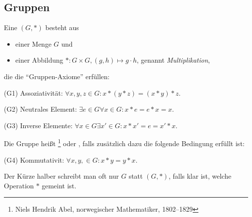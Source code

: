
\subsection{Gruppen}\label{gruppen}

\begin{definition}[Gruppen]
    \label{gruppen:def}
    Eine  $(G,*)$ besteht aus
    \begin{itemize}
        \item einer Menge $G$ und
        \item einer Abbildung $*: G\times G, (g,h) \mapsto g\cdot h$, genannt \emph{Multiplikation},
    \end{itemize}
    die die \enquote{Gruppen-Axiome} erfüllen:

    \begin{description}
        \item{(G1)} Assoziativität: $\forall x,y,z\in G: x\ast (y\ast z)=(x\ast y)\ast z$.
        \item{(G2)} Neutrales Element: $\exists e \in G \forall x\in G: x\ast e=e\ast x=x$.
        \item{(G3)} Inverse Elemente: $\forall x \in G \exists x' \in G: x\ast x' = e = x'\ast x$.
    \end{description}
    Die Gruppe heißt \footnote{Niels Hendrik Abel, norwegischer Mathematiker, 1802--1829} oder , falls zusätzlich dazu die folgende Bedingung erfüllt ist:
    \begin{description}
        \item{(G4)} Kommutativit: $\forall x,y,\in G: x\ast y=y\ast x$.
    \end{description}

    Der Kürze halber schreibt man oft nur $G$ statt $(G,\ast)$, falls klar ist, welche Operation $\ast$ gemeint ist.
\end{definition}

